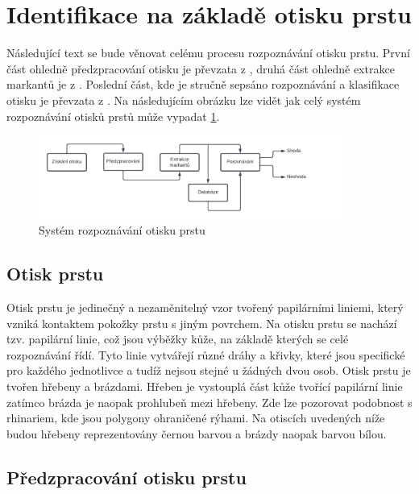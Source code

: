 \newpage
\section{Identifikace na základě otisku prstu}
\label{Identifikace na základě otisku prstu}

Následující text se bude věnovat celému procesu rozpoznávání otisku prstu. První část ohledně předzpracování otisku je převzata z \cite{otiskyPrstu, otiskyPrstu2}, druhá část ohledně extrakce markantů je z \cite{jain1999multichannel}. Poslední část, kde je stručně sepsáno rozpoznávání a klasifikace otisku je převzata z \cite{otiskyPrstu}. Na následujícím obrázku lze vidět jak celý systém rozpoznávání otisků prstů může vypadat \ref{finger_preprocessing_system}.

\begin{figure}[h]
	\centering
	\includegraphics[width=0.9\textwidth]{obrazky/finger_proces.png}
	\caption{Systém rozpoznávání otisku prstu \cite{fingerprintOverview}}
	\label{finger_preprocessing_system}
\end{figure}


\subsection{Otisk prstu}
\label{Otisk prstu}
Otisk prstu je jedinečný a nezaměnitelný vzor tvořený papilárními liniemi, který vzniká kontaktem pokožky prstu s jiným povrchem. Na otisku prstu se nachází tzv. papilární linie, což jsou výběžky kůže, na základě kterých se celé rozpoznávání řídí. Tyto linie vytvářejí různé dráhy a křivky, které jsou specifické pro každého jednotlivce a tudíž nejsou stejné u žádných dvou osob. Otisk prstu je tvořen hřebeny a brázdami. Hřeben je vystouplá část kůže tvořící papilární linie zatímco brázda je naopak prohlubeň mezi hřebeny. Zde lze pozorovat podobnost s rhinariem, kde jsou polygony ohraničené rýhami. Na otiscích uvedených níže budou hřebeny reprezentovány černou barvou a brázdy naopak barvou bílou.


\subsection{Předzpracování otisku prstu}
\label{Předzpracování otisku prstu}

